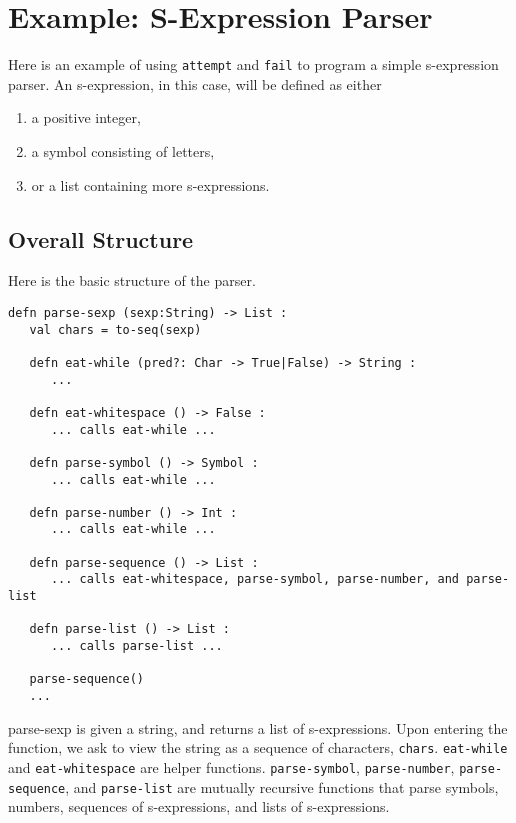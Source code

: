 \documentclass[10pt,oneside]{book}
\begin{document}
\section{Example: S-Expression Parser}
Here is an example of using \texttt{\frenchspacing attempt} and \texttt{\frenchspacing fail} to program a simple s-expression parser. An s-expression, in this case, will be defined as either
\begin{enumerate}
\item a positive integer,
\item a symbol consisting of letters,
\item or a list containing more s-expressions.
\end{enumerate}

\subsection*{Overall Structure}
Here is the basic structure of the parser.
\begin{lstlisting}
defn parse-sexp (sexp:String) -> List :
   val chars = to-seq(sexp)

   defn eat-while (pred?: Char -> True|False) -> String :
      ...

   defn eat-whitespace () -> False :
      ... calls eat-while ...
   
   defn parse-symbol () -> Symbol :
      ... calls eat-while ...
         
   defn parse-number () -> Int :
      ... calls eat-while ...

   defn parse-sequence () -> List :
      ... calls eat-whitespace, parse-symbol, parse-number, and parse-list
      
   defn parse-list () -> List :
      ... calls parse-list ...

   parse-sequence()
   ...
\end{lstlisting}

parse-sexp is given a string, and returns a list of s-expressions. Upon entering the function, we ask to view the string as a sequence of characters, \texttt{\frenchspacing chars}. \texttt{\frenchspacing eat-while} and \texttt{\frenchspacing eat-whitespace} are helper functions. \texttt{\frenchspacing parse-symbol}, \texttt{\frenchspacing parse-number}, \texttt{\frenchspacing parse-sequence}, and \texttt{\frenchspacing parse-list} are mutually recursive functions that parse symbols, numbers, sequences of s-expressions, and lists of s-expressions.
\end{document}
